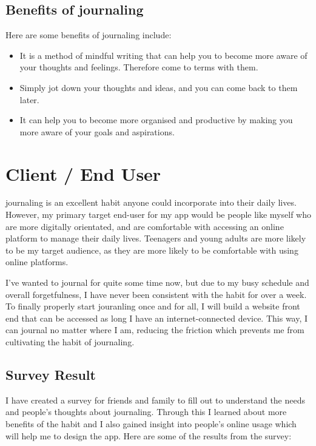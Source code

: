 \subsection{Benefits of journaling}
Here are some benefits of journaling include:
\begin{itemize}
  \item It is a method of mindful writing that can help you to become more aware of your thoughts and feelings. Therefore come to terms with them.
  \item Simply jot down your thoughts and ideas, and you can come back to them later.
  \item It can help you to become more organised and productive by making you more aware of your goals and aspirations.
\end{itemize}

\bigskip

\section{Client / End User}

\newcommand{\question}[1]{\item[Q\refstepcounter{question}\thequestion.] \textit{#1}}
\newcommand{\answer}[1]{\item[A\thequestion.] #1}

journaling is an excellent habit anyone could incorporate into their daily lives. However, my primary target end-user for my app would be people like myself who are more digitally orientated, and are comfortable with accessing an online platform to manage their daily lives. Teenagers and young adults are more likely to be my target audience, as they are more likely to be comfortable with using online platforms.

I've wanted to journal for quite some time now, but due to my busy schedule and overall forgetfulness, I have never been consistent with the habit for over a week. To finally properly start jouranling once and for all, I will build a website front end that can be accessed as long I have an internet-connected device. This way, I can journal no matter where I am, reducing the friction which prevents me from cultivating the habit of journaling.

\subsection{Survey Result}
I have created a survey for friends and family to fill out to understand the needs and people's thoughts about journaling. Through this I learned about more benefits of the habit and I also gained insight into people's online usage which will help me to design the app. Here are some of the results from the survey:



